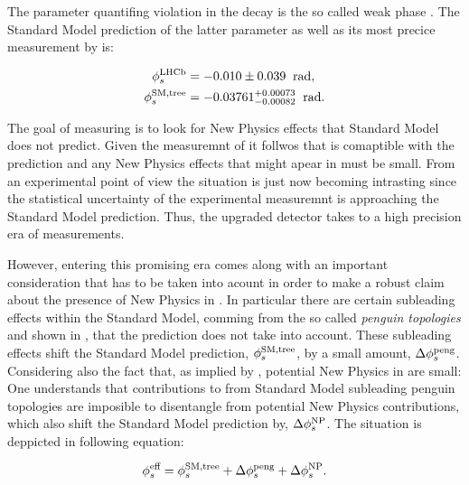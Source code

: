 The parameter quantifing \CP violation in the \BsJpsiPhi decay is the so called weak phase \phis.
The Standard Model prediction of the latter parameter as well as its most precice measurement by
\lhcb is:

\begin{subequations}
  \label{app_phis_lhcb_theo}
  \begin{align}
  \centering
  \phiS{\lhcb}           &=  -0.010 \pm 0.039  \;\; \text{rad},
  \label{app_phis_lhcb}\\
  \phiS{SM,tree}  &= -0.03761 {}^{+0.00073}_{-0.00082}  \;\; \text{rad}.
  \label{app_phis_theo}
\end{align}
\end{subequations}

\noindent The goal of measuring \phis is to look for New Physics effects that Standard Model
does not predict. Given the measuremnt of  it follwos that \phis is comaptible
with the prediction and any New Physics effects that might apear in \phis must be small.
From an experimental point of view the situation is just now becoming intrasting
since the statistical uncertainty of the experimental measuremnt is approaching the Standard
Model prediction. Thus, the upgraded \lhcb detector takes \phis to a high precision era
of measurements.

However, entering this promising era comes along with an important consideration
that has to be taken into acount in order to make a robust claim about the presence of New Physics
in \phis. In particular there are certain subleading effects within the Standard Model, comming from
the so called {\it penguin topologies} and shown in , that the
\phis prediction does not take into account. These subleading effects shift
the Standard Model prediction, $\phi_{s}^{\tiny \text{SM,tree}}$, by a small amount, $\Delta\phi_{s}^{\tiny\text{peng}}$.
Considering also the fact that, as implied by , potential New Physics in
\phis are small: One understands that contributions to \phis from Standard Model subleading penguin
topologies are imposible to disentangle from potential New Physics contributions, which also shift
the Standard Model prediction by, $\Delta\phi_{s}^{\tiny \text{NP}}$. The situation is deppicted in
following equation:

\begin{equation}
\centering
 \phis^{\text {eff}} = \phis^{\tiny \text{SM,tree}} + \Delta\phiS{peng} + \Delta\phis^{\tiny \text{NP}}.
 \label{app_phis_sm_peng}
\end{equation}

